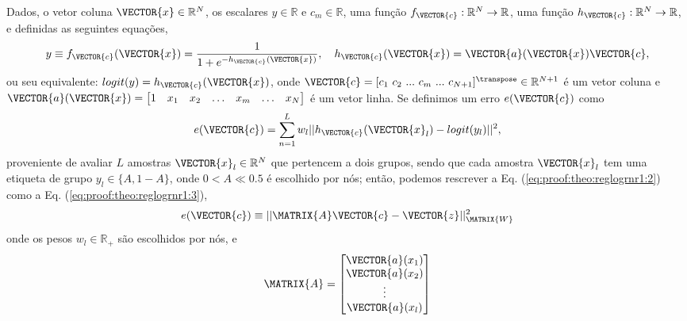 
\begin{myproofT}\label{proof:theo:reglogrnr1}
Dados,
o vetor coluna $\VECTOR{x} \in \mathbb{R}^{N}$, os escalares $y \in \mathbb{R}$ e $c_m \in \mathbb{R}$,
uma função $f_{\VECTOR{c}}:\mathbb{R}^{N} \rightarrow \mathbb{R}$, 
uma função $h_{\VECTOR{c}}:\mathbb{R}^{N} \rightarrow \mathbb{R}$,  e 
definidas as seguintes equações,
\begin{equation}\label{eq:proof:theo:reglogrnr1:1}
y\equiv f_{\VECTOR{c}}(\VECTOR{x})= \frac{1}{1+e^{-h_{\VECTOR{c}}(\VECTOR{x}) }},
\quad h_{\VECTOR{c}}(\VECTOR{x}) =  \VECTOR{a}(\VECTOR{x})\VECTOR{c},
\end{equation}
ou seu equivalente: $logit(y)=h_{\VECTOR{c}}(\VECTOR{x})$,
onde $\VECTOR{c}=[c_1~ c_2~ ...~ c_m~ ...~ c_{N+1}]^{\transpose} \in \mathbb{R}^{N+1}$ é um vetor coluna e
$\VECTOR{a}(\VECTOR{x})=\begin{bmatrix} 
1& x_1& x_2& \hdots & x_m& \hdots& x_N
\end{bmatrix}$ é um vetor linha.
Se definimos um erro $e(\VECTOR{c})$ como
\begin{equation}\label{eq:proof:theo:reglogrnr1:2}
e(\VECTOR{c}) =  \sum_{n=1}^{L} w_l||h_{\VECTOR{c}}(\VECTOR{x}_l)-logit(y_l)||^2,
\end{equation}
proveniente de avaliar $L$ amostras $\VECTOR{x}_l \in \mathbb{R}^{N}$ que pertencem a dois grupos, 
sendo que cada amostra $\VECTOR{x}_l$ tem uma etiqueta de grupo $y_l\in \{A,1-A\}$, 
onde $0<A\ll 0.5$ é escolhido por nós;
então, podemos rescrever a Eq. (\ref{eq:proof:theo:reglogrnr1:2}) como a Eq. (\ref{eq:proof:theo:reglogrnr1:3}),
\begin{equation}\label{eq:proof:theo:reglogrnr1:3}
e(\VECTOR{c}) \equiv ||\MATRIX{A}\VECTOR{c}-\VECTOR{z}||_{\MATRIX{W}}^2 
\end{equation}
onde os pesos $w_l \in \mathbb{R}_+$ são escolhidos por nós, e 
\begin{equation}\label{eq:proof:reglogrnr1:4}
\MATRIX{A}=\begin{bmatrix}
\VECTOR{a}(x_1)\\
\VECTOR{a}(x_2)\\
\vdots\\
\VECTOR{a}(x_l)\\

\end{bmatrix}
\end{equation}
\end{myproofT}
